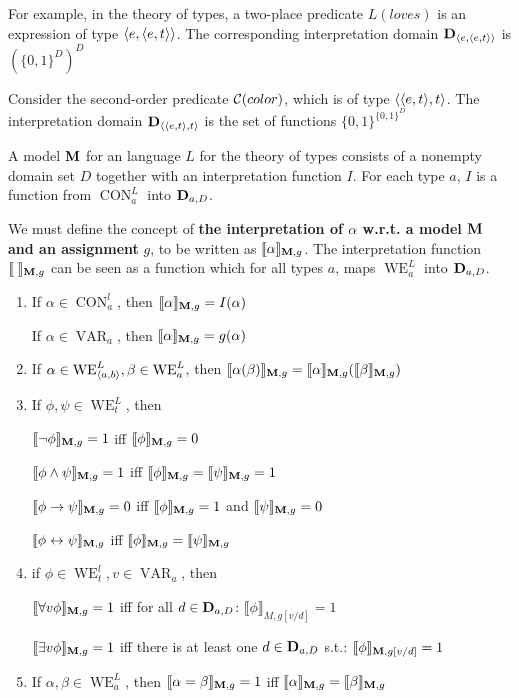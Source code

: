 \documentclass[11pt]{article}
\DeclareMathOperator{\VAR}{VAR}
\DeclareMathOperator{\CON}{CON}
\DeclareMathOperator{\WE}{WE}
\begin{document}
For example, in the theory of types, a two-place predicate \(L(loves)\) is
an expression of type \(\langle e,\langle e,t\rangle\rangle\). The corresponding
interpretation domain \(\operatorname{\textbf{D}}_{\langle e,\langle e,t\rangle\rangle}\) is \((\{0,1\}^D)^D\)

Consider the second-order predicate \(\mathcal{C}(color)\), which is of type
\(\langle\langle e,t\rangle,t\rangle\). The interpretation domain \(\operatorname{\textbf{D}}_{\langle\langle
    e,t\rangle,t\rangle}\) is the set of functions \(\{0,1\}^{\{0,1\}^D}\)

A model \(\operatorname{\textbf{M}}\) for an language \(L\) for the theory of types consists of a
nonempty domain set \(D\) together with an interpretation function \(I\).
For each type \(a\), \(I\) is a function from \(\CON_a^L\) into \(\operatorname{\textbf{D}}_{a,D}\).

We must define the concept of \textbf{the interpretation of \(\alpha\) w.r.t. a model \(\operatorname{\textbf{M}}\)}
\textbf{and an assignment} \(g\), to be written as
\(\llbracket\alpha\rrbracket_{\operatorname{\textbf{M}},g}\). The interpretation
function\(\llbracket\;\rrbracket_{\operatorname{\textbf{M}},g}\) can be seen as a function which
for all types \(a\), maps \(\WE^L_a\) into \(\operatorname{\textbf{D}}_{a,D}\).

\begin{definition}[]
\begin{enumerate}
\item If \(\alpha\in \CON_a^l\), then
\(\llbracket\alpha\rrbracket_{\operatorname{\textbf{M}},g}=I(\alpha)\)

If \(\alpha\in \VAR_a\), then \(\llbracket\alpha\rrbracket_{\operatorname{\textbf{M}},g}=g(\alpha)\)

\item If \(\alpha\in \WE^L_{\la a,b\ra},\beta\in \WE^L_a\), then
\(\llbracket\alpha(\beta)\rrbracket_{\operatorname{\textbf{M}},g}=\llbracket\alpha\rrbracket_{\operatorname{\textbf{M}},g}(
       \llbracket\beta\rrbracket_{\operatorname{\textbf{M}},g})\)

\item If \(\phi,\psi\in \WE_t^L\), then

\(\llbracket\neg\phi\rrbracket_{\operatorname{\textbf{M}},g}=1\) iff
\(\llbracket\phi\rrbracket_{\operatorname{\textbf{M}},g}=0\)

\(\llbracket\phi\wedge\psi\rrbracket_{\operatorname{\textbf{M}},g}=1\) iff
\(\llbracket\phi\rrbracket_{\operatorname{\textbf{M}},g}=\llbracket\psi\rrbracket_{\operatorname{\textbf{M}},g}=1\)

\(\llbracket\phi\to\psi\rrbracket_{\operatorname{\textbf{M}},g}=0\) iff
\(\llbracket\phi\rrbracket_{\operatorname{\textbf{M}},g}=1\) and
\(\llbracket\psi\rrbracket_{\operatorname{\textbf{M}},g}=0\)

\(\llbracket\phi\leftrightarrow\psi\rrbracket_{\operatorname{\textbf{M}},g}\) iff
\(\llbracket\phi\rrbracket_{\operatorname{\textbf{M}},g}=\llbracket\psi\rrbracket_{\operatorname{\textbf{M}},g}\)

\item if \(\phi\in \WE_t^l,v\in \VAR_a\), then

\(\llbracket\forall v\phi\rrbracket_{\operatorname{\textbf{M}},g}=1\) iff for all
\(d\in\operatorname{\textbf{D}}_{a,D}\):
\(\llbracket\phi\rrbracket_{M,g[v/d]}=1\)

\(\llbracket\exists v\phi\rrbracket_{\operatorname{\textbf{M}},g}=1\) iff there is at least one
\(d\in\operatorname{\textbf{D}}_{a,D}\) s.t.: \(\llbracket\phi\rrbracket_{\operatorname{\textbf{M}},g[v/d]}=1\)

\item If \(\alpha,\beta\in \WE_a^L\), then
\(\llbracket\alpha=\beta\rrbracket_{\operatorname{\textbf{M}},g}=1\) iff
\(\llbracket\alpha\rrbracket_{\operatorname{\textbf{M}},g}=\llbracket\beta\rrbracket_{\operatorname{\textbf{M}},g}\)
\end{enumerate}
\end{definition}
\end{document}
